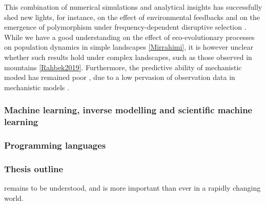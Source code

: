 % 
This combination of numerical simulations and analytical insights has successfully shed new lights, for instance, on the effect of environmental feedbacks and on the emergence of polymorphism under frequency-dependent disruptive selection \cite{Dieckmann1999,Doebeli2003}.
% 
While we have a good understanding on the effect of eco-evolutionary processes on population dynamics in simple landscapes \cref{Mirrahimi}, it is however unclear whether such results hold under complex landscapes, such as those observed in mountains \cref{Rahbek2019}.
% 
Furthermore, the predictive ability of mechanistic modesl has remained poor \cite{DeAngelis2015}, due to a low pervasion of observation data in mechanistic models \cite{XXX}.

\subsubsection*{Machine learning, inverse modelling and scientific machine learning}


\subsubsection*{Programming languages}


\subsubsection*{Thesis outline}



\newpage

remains to be understood, and is more important than ever in a rapidly changing world.

